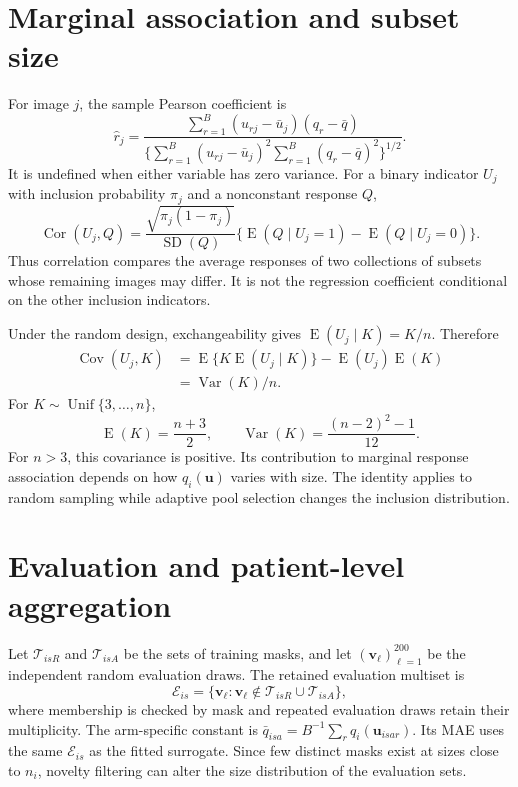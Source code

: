 \section{Marginal association and subset size}\label{app:marginal}
For image $j$, the sample Pearson coefficient is
\begin{equation}
\widehat r_j=
\frac{\sum_{r=1}^B(u_{rj}-\bar u_j)(q_r-\bar q)}
{\{\sum_{r=1}^B(u_{rj}-\bar u_j)^2
\sum_{r=1}^B(q_r-\bar q)^2\}^{1/2}}.
\end{equation}
It is undefined when either variable has zero variance. For a binary indicator $U_j$ with inclusion probability $\pi_j$ and a nonconstant response $Q$,
\begin{equation}
\operatorname{Cor}(U_j,Q)=
\frac{\sqrt{\pi_j(1-\pi_j)}}{\operatorname{SD}(Q)}
\{\operatorname E(Q\mid U_j=1)-\operatorname E(Q\mid U_j=0)\}.
\end{equation}
Thus correlation compares the average responses of two collections of subsets whose remaining images may differ. It is not the regression coefficient conditional on the other inclusion indicators.

Under the random design, exchangeability gives $\operatorname E(U_j\mid K)=K/n$. Therefore
\begin{align}
\operatorname{Cov}(U_j,K)
&=\operatorname E\{K\operatorname E(U_j\mid K)\}
-\operatorname E(U_j)\operatorname E(K)\\
&=\operatorname{Var}(K)/n.
\end{align}
For $K\sim\operatorname{Unif}\{3,\ldots,n\}$,
\begin{equation}
\operatorname E(K)=\frac{n+3}{2},\qquad
\operatorname{Var}(K)=\frac{(n-2)^2-1}{12}.
\end{equation}
For $n>3$, this covariance is positive. Its contribution to marginal response association depends on how $q_i(\boldsymbol u)$ varies with size. The identity applies to random sampling while adaptive pool selection changes the inclusion distribution.

\section{Evaluation and patient-level aggregation}\label{app:evaluation}
Let $\mathcal T_{isR}$ and $\mathcal T_{isA}$ be the sets of training masks, and let $(\boldsymbol v_\ell)_{\ell=1}^{200}$ be the independent random evaluation draws. The retained evaluation multiset is
\begin{equation}
\mathcal E_{is}=\{\boldsymbol v_\ell:\boldsymbol v_\ell\notin
\mathcal T_{isR}\cup\mathcal T_{isA}\},
\end{equation}
where membership is checked by mask and repeated evaluation draws retain their multiplicity. The arm-specific constant is $\bar q_{isa}=B^{-1}\sum_rq_i(\boldsymbol u_{isar})$. Its MAE uses the same $\mathcal E_{is}$ as the fitted surrogate. Since few distinct masks exist at sizes close to $n_i$, novelty filtering can alter the size distribution of the evaluation sets.

